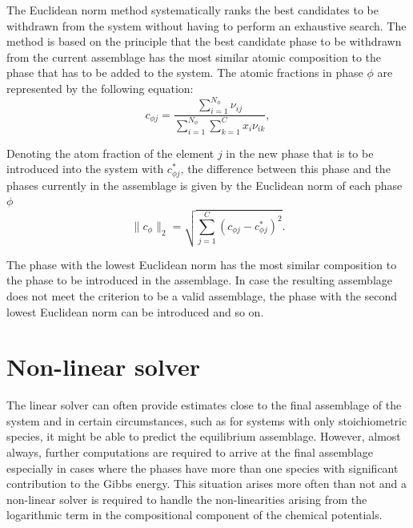 	The Euclidean norm method systematically ranks the best candidates to be withdrawn from the system without having to perform an exhaustive search. The method is based on the principle that the best candidate phase to be withdrawn from the current assemblage has the most similar atomic composition to the phase that has to be added to the system. The atomic fractions in phase $\phi$ are represented by the following equation:
	\begin{equation}
		c_{\phi j} = \frac{\sum_{i=1}^{N_{\phi}} \nu_{ij}}{\sum_{i=1}^{N_{\phi}} \sum_{k=1}^{C} x_i \nu_{ik}},
	\end{equation}
%	
%
%

	Denoting the atom fraction of the element $j$ in the new phase that is to be introduced into the system with $c_{\phi j}^{*}$, the difference between this phase and the phases currently in the assemblage is given by the Euclidean norm of each phase $\phi$
	\begin{equation}
		\|c_\phi\|_2 = \sqrt{\sum_{j=1}^{C} \left(c_{\phi j} - c_{\phi j}^{*}\right)^2}.
	\end{equation}

	The phase with the lowest Euclidean norm has the most similar composition to the phase to be introduced in the assemblage. In case the resulting assemblage does not meet the criterion to be a valid assemblage, the phase with the second lowest Euclidean norm can be introduced and so on.

\section{Non-linear solver}
	The linear solver can often provide estimates close to the final assemblage of the system and in certain circumstances, such as for systems with only stoichiometric species, it might be able to predict the equilibrium assemblage. However, almost always, further computations are required to arrive at the final assemblage especially in cases where the phases have more than one species with significant contribution to the Gibbs energy. This situation arises more often than not and a non-linear solver is required to handle the non-linearities arising from the logarithmic term in the compositional component of the chemical potentials.

